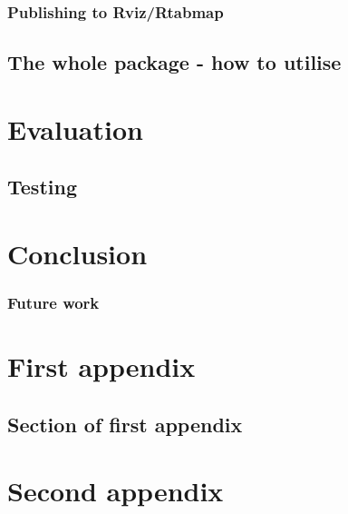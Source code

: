 \documentclass{mproj}
\begin{document}
\subsection{Publishing to Rviz/Rtabmap}
\section{The whole package - how to utilise}
\chapter{Evaluation}
\section{Testing}

\chapter{Conclusion}\label{conclusion}
\subsection{Future work}

\appendix %
\chapter{First appendix}

\section{Section of first appendix}

\chapter{Second appendix}



\end{document}
